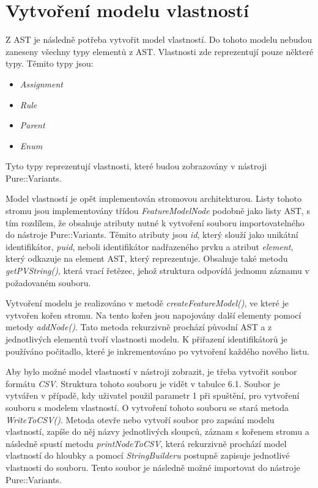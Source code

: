 \section{Vytvoření modelu vlastností}
Z AST je následně potřeba vytvořit model vlastností. Do tohoto modelu nebudou zaneseny všechny typy elementů z AST. Vlastnosti zde reprezentují pouze některé typy. Těmito typy jsou: 
\begin{itemize}
	\item \textit{Assignment}
	\item \textit{Rule}
	\item \textit{Parent}
	\item \textit{Enum}
\end{itemize}

Tyto typy reprezentují vlastnosti, které budou zobrazovány v nástroji Pure::Variants. 

Model vlastností je opět implementován stromovou architekturou. Listy tohoto stromu jsou implementovány třídou \textit{FeatureModelNode} podobně jako listy AST, s tím rozdílem, že obsahuje atributy nutné k vytvoření souboru importovatelného do nástroje Pure::Variants. Těmito atributy jsou \textit{id}, který slouží jako unikátní identifikátor, \textit{puid}, neboli identifikátor nadřazeného prvku a atribut \textit{element}, který odkazuje na element AST, který reprezentuje. Obsahuje také metodu \textit{getPVString()}, která vrací řetězec, jehož struktura odpovídá jednomu záznamu v požadovaném souboru.

Vytvoření modelu je realizováno v metodě \textit{createFeatureModel()}, ve které je vytvořen kořen stromu. Na tento kořen jsou napojovány další elementy pomocí metody \textit{addNode()}. Tato metoda rekurzivně prochází původní AST a z jednotlivých elementů tvoří vlastnosti modelu. K přiřazení identifikátorů je používáno počitadlo, které je inkrementováno po vytvoření každého nového listu. 

Aby bylo možné model vlastností v nástroji zobrazit, je třeba vytvořit soubor formátu \textit{CSV}. Struktura tohoto souboru je vidět v tabulce 6.1. Soubor je vytvářen v případě, kdy uživatel použil parametr 1 při spuštění, pro vytvoření souboru s modelem vlastností. O vytvoření tohoto souboru se stará metoda \textit{WriteToCSV()}. Metoda otevře nebo vytvoří soubor pro zapsání modelu vlastností, zapíše do něj názvy jednotlivých sloupců, záznam s kořenem stromu a následně spustí metodu \textit{printNodeToCSV}, která rekurzivně prochází model vlastností do hloubky a pomocí \textit{StringBuilderu} postupně zapisuje jednotlivé vlastnosti do souboru. Tento soubor je následně možné importovat do nástroje Pure::Variants. 

